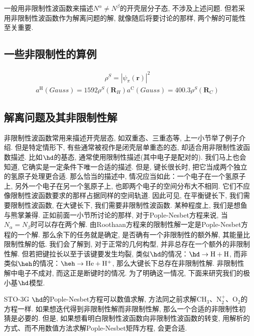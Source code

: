 一般用非限制性波函数来描述$N^\alpha\neq N^\beta$的开壳层分子态, 不涉及上述问题. 
但若采用非限制性波函数作为解离问题的解, 就像随后将要讨论的那样, 两个解的可能性至关重要. 

\subsection{一些非限制性的算例}

\begin{align}
    \rho^S = |\psi_\pi(\mathbf{r})|^2
\end{align}
\begin{align}
    a^\mathrm{H}(Gauss) = 1592\rho^S(\mathbf{R}_H)
    a^\mathrm{C}(Gauss) = 400.3\rho^S(\mathbf{R}_C)
\end{align}

\subsection{解离问题及其非限制性解}
非限制性波函数常用来描述开壳层态, 
如双重态、三重态等, 
上一小节举了例子介绍. 
但是特定情形下, 
有些通常被视作是闭壳层单重态的态, 
却适合用非限制性波函数描述. 
比如$\hd$的基态, 
通常使用限制性描述(其中电子是配对的). 
我们马上也会知道, 
它确实是一定条件下唯一合适的\hft 描述. 
但是, 
键长很长时, 
把它当成两个独立的氢原子处理更合适. 
那么恰当的描述中, 
情况应当如此：一个电子在一个氢原子上, 
另外一个电子在另一个氢原子上, 
也即两个电子的空间分布大不相同. 
它们不应像限制性波函数要求的那样占据同样的空间轨道. 
因此可见, 
在平衡键长下, 
我们需要限制性波函数, 
在大键长下, 
我们需要非限制性波函数. 
某种程度上, 
我们是想鱼与熊掌兼得. 
正如前面一小节所讨论的那样, 
对于Pople-Nesbet方程来说, 
当$N_\alpha=N_\beta$时可以存在两个解. 
由Roothaan方程来的限制性解一定是Pople-Nesbet方程的一个解.
那么余下的任务就是确定, 
是否确有一个非限制性的额外解, 
其能量比限制性解的低. 
我们会了解到, 
对于正常的几何构型, 
并非总存在一个额外的非限制性解. 
但若把键拉长以至于该键要发生均裂, 
类似$\hd$的情况：$\hd\to \mathrm{H+H}$, 
而非类似$\heh$的情况：$\heh\to \mathrm{He+H^+}$, 
那么大键长下总存在非限制性解. 
非限制性解中电子不成对, 
而这正是断键时的情况. 
为了明确这一情况, 
下面来研究我们的极小基$\hd$模型. 


STO-3G $\hd$的Pople-Nesbet方程可以数值求解, 
方法同之前求解$\mathrm{CH_3}$、$\mathrm{N_2^+}$、$\mathrm{O_2}$的方程一样. 
如果想迭代得到非限制性解而非限制性解, 
那么一个合适的非限制性初猜是必要的. 
但是, 
如果想看明白限制性波函数向非限制性波函数的转变,
用解析的方式、而不用数值方法求解Pople-Nesbet矩阵方程,
会更合适.


